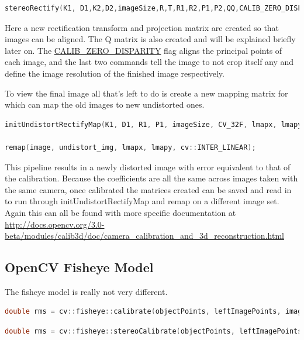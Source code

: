 \documentclass{article}
\begin{document}
\begin{lstlisting}[language=C++, frame=single, breaklines]
stereoRectify(K1, D1,K2,D2,imageSize,R,T,R1,R2,P1,P2,QQ,CALIB_ZERO_DISPARITY, 1, imageSize);
\end{lstlisting}

Here a new rectification transform and projection matrix are created so that images can be aligned. The Q matrix is also created and will be explained briefly later on. The \url{CALIB_ZERO_DISPARITY} flag aligns the principal points of each image, and the last two commands tell the image to not crop itself any and define the image resolution of the finished image respectively. 

To view the final image all that's left to do is create a new mapping matrix for which can map the old images to new undistorted ones. 

\begin{lstlisting}[language=C++, frame=single, breaklines]
initUndistortRectifyMap(K1, D1, R1, P1, imageSize, CV_32F, lmapx, lmapy);

remap(image, undistort_img, lmapx, lmapy, cv::INTER_LINEAR);
\end{lstlisting}
	
This pipeline results in a newly distorted image with error equivalent to that of the calibration. Because the coefficients are all the same across images taken with the same camera, once calibrated the matrices created can be saved and read in to run through initUndistortRectifyMap and remap on a different image set. Again this can all be found with more specific documentation at \url{http://docs.opencv.org/3.0-beta/modules/calib3d/doc/camera_calibration_and_3d_reconstruction.html}

\subsection{OpenCV Fisheye Model}

The fisheye model is really not very different.

\begin{lstlisting}[language=C++, frame=single, breaklines]
double rms = cv::fisheye::calibrate(objectPoints, leftImagePoints, imageSize, K1, D1, rvecs, tvecs, flag, cv::TermCriteria(3, 20, 1e-6));
\end{lstlisting}

\begin{lstlisting}[language=C++, frame=single, breaklines]
double rms = cv::fisheye::stereoCalibrate(objectPoints, leftImagePoints, rightImagePoints, K1, D1, K2, D2, imageSize, R, T, flag, cv::TermCriteria(3, 20, 1e-6));
\end{lstlisting}
\end{document}
